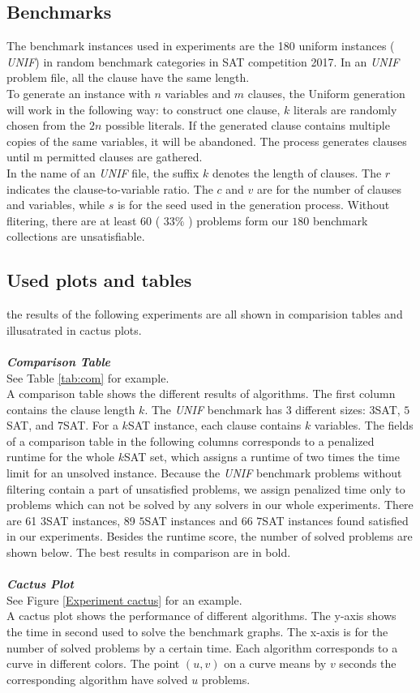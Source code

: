 \documentclass[12pt,a4paper,twoside]{scrartcl}
\numberwithin{equation}{section}
\begin{document}
\subsection{Benchmarks}
\label{benchmark}
The benchmark instances used in experiments are the 180 uniform instances ( \emph{UNIF}) in random benchmark categories in SAT competition 2017\cite{balyo2017proceedings}. In an  \emph{UNIF} problem file, all the clause have the same length.\\
To generate an instance with $n$ variables and $m$ clauses, the Uniform generation will work in the following way: to construct one clause, $k$ literals are randomly chosen from the $2n$ possible literals. If the generated clause contains multiple copies of the same variables, it will be abandoned. The process generates clauses until m permitted clauses are gathered.\\
In the name of an \emph{UNIF} file, the suffix $k$  denotes the length of clauses. The $r$ indicates the clause-to-variable ratio. The $c$ and $v$ are for the number of clauses and variables, while $s$ is for the seed used in the generation process.
Without flitering, there are at least $60$ ( $33\%$ ) problems form our $180$ benchmark collections are unsatisfiable.
\subsection{Used plots and tables}
the results of the following experiments are all shown in comparision tables and  illusatrated in cactus plots.  \\
\\
\emph{\textbf{Comparison Table}}\\
See Table \ref{tab:com} for example.\\
A comparison table shows the different results of algorithms. The first column contains the
clause length $k$. The  \emph{UNIF} benchmark has $3$ different sizes: $3$SAT, $5$SAT, and $7$SAT. For a $k$SAT instance, each clause contains $k$ variables. The fields of a comparison table in the following columns corresponds to a penalized runtime for the whole $k$SAT set, which assigns a runtime of two times the time limit for an unsolved instance. Because the  \emph{UNIF} benchmark problems without filtering contain a part of unsatisfied problems, we assign penalized time only to problems which can not be solved by any solvers in our whole experiments. There are 61 $3$SAT instances, 89 $5$SAT instances and 66 $7$SAT instances found satisfied in our experiments. Besides the runtime score, the number of solved problems are shown below. The best results in comparison are in bold.
\\
\\
\emph{\textbf{Cactus Plot}}\\
See Figure \ref{Experiment cactus} for an example.\\
A cactus plot shows the performance of different algorithms. The y-axis shows the time in second used to solve the benchmark graphs.  The x-axis is for the number of solved problems by a certain time. Each algorithm corresponds to a curve in different colors. The point $(u, v)$ on a curve means by $v$ seconds the corresponding algorithm have solved  $u$ problems.  \\
\end{document}
